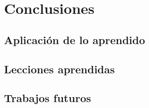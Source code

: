 \documentclass[a4paper, 12pt]{book}
\begin{document}

\cleardoublepage
\chapter{Conclusiones}
\label{chap:conclusiones}


\section{Aplicación de lo aprendido}
\label{sec:aplicacion}



\section{Lecciones aprendidas}
\label{sec:lecciones_aprendidas}


\section{Trabajos futuros}
\label{sec:trabajos_futuros}


\cleardoublepage


 
\end{document}
